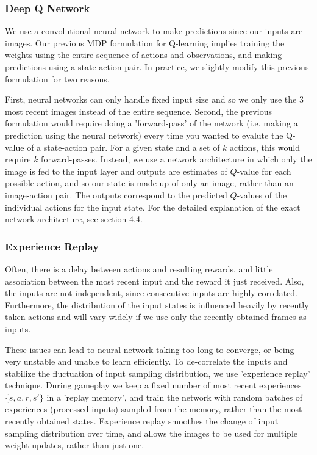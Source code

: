 \documentclass{article}
\begin{document}
\begin{multicols}{2}
\subsubsection{Deep Q Network}

We use a convolutional neural network to make predictions since our inputs are images. Our previous MDP formulation for Q-learning implies training the weights using the entire sequence of actions and observations, and making predictions using a state-action pair. In practice, we slightly modify this previous formulation for two reasons.

First, neural networks can only handle fixed input size and so we only use the 3 most recent images instead of the entire sequence. 
Second, the previous formulation would require doing a 'forward-pass' of the network (i.e. making a prediction using the neural network) every time you wanted to evalute the Q-value of a state-action pair. For a given state and a set of $k$ actions, this would require $k$ forward-passes. Instead, we use a network architecture in which only the image is fed to the input layer and outputs are estimates of $Q$-value for each possible action, and so our state is made up of only an image, rather than an image-action pair. The outputs correspond to the predicted $Q$-values of the individual actions for the input state. For the detailed explanation of the exact network architecture, see section 4.4.

\subsubsection{Experience Replay}

Often, there is a delay between actions and resulting rewards, and little association between the most recent input and the reward it just received. Also, the inputs are not independent, since consecutive inputs are highly correlated. Furthermore, the distribution of the input states is influenced heavily by recently taken actions and will vary widely if we use only the recently obtained frames as inputs.

These issues can lead to neural network taking too long to converge, or being very unstable and unable to learn efficiently. To de-correlate the inputs and stabilize the fluctuation of input sampling distribution, we use 'experience replay' technique. During gameplay we keep a fixed number of most recent experiences $\{s, a, r, s'\}$ in a 'replay memory', and train the network with random batches of experiences (processed inputs) sampled from the memory, rather than the most recently obtained states. Experience replay smoothes the change of input sampling distribution over time, and allows the images to be used for multiple weight updates, rather than just one.


\end{multicols}
\end{document}
